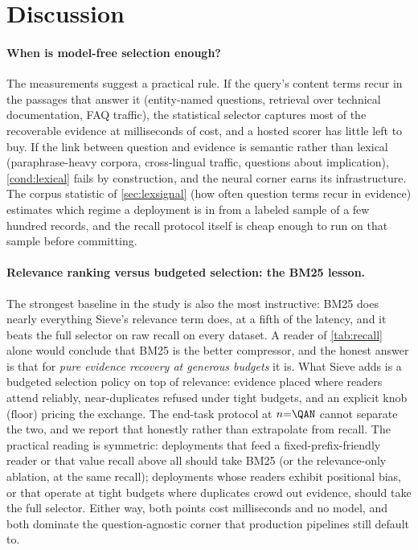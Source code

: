 \documentclass[preprint,12pt]{elsarticle}
\theoremstyle{remark}
\newcommand{\method}{Sieve}
\begin{document}
\section{Discussion}
\label{sec:discussion}

\paragraph{When is model-free selection enough?}
The measurements suggest a practical rule. If the query's content
terms recur in the passages that answer it (entity-named questions,
retrieval over technical documentation, FAQ traffic), the statistical
selector captures most of the recoverable evidence at milliseconds of
cost, and a hosted scorer has little left to buy. If the link between
question and evidence is semantic rather than lexical
(paraphrase-heavy corpora, cross-lingual traffic, questions about
implication), \autoref{cond:lexical} fails by construction, and the
neural corner earns its infrastructure. The corpus statistic of
\autoref{sec:lexsignal} (how often question terms recur in evidence)
estimates which regime a deployment is in from a labeled sample of a
few hundred records, and the recall protocol itself is cheap enough
to run on that sample before committing.

\paragraph{Relevance ranking versus budgeted selection: the BM25
lesson.}
The strongest baseline in the study is also the most instructive: BM25
does nearly everything \method{}'s relevance term does, at a fifth of
the latency, and it beats the full selector on raw recall on every
dataset. A reader of \autoref{tab:recall} alone would conclude that
BM25 is the better compressor, and the honest answer is that for
\emph{pure evidence recovery at generous budgets} it is. What
\method{} adds is a budgeted selection policy on top of relevance:
evidence placed where readers attend reliably, near-duplicates
refused under tight budgets, and an explicit knob
($\mathrm{floor}$) pricing the exchange. The end-task protocol at
$n{=}\QAN$ cannot separate the two, and we report that honestly rather
than extrapolate from recall. The practical reading is symmetric:
deployments that feed a fixed-prefix-friendly reader or that value
recall above all should take BM25 (or the relevance-only ablation, at
the same recall); deployments whose readers exhibit positional bias,
or that operate at tight budgets where duplicates crowd out evidence,
should take the full selector. Either way, both points cost
milliseconds and no model, and both dominate the question-agnostic
corner that production pipelines still default to.
\end{document}
